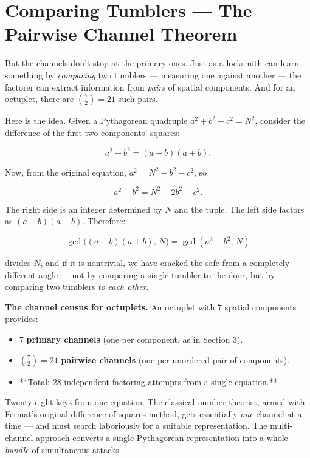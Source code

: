 \bigskip


\section{Comparing Tumblers --- The Pairwise Channel Theorem}

But the channels don't stop at the primary ones. Just as a locksmith can learn something by \textit{comparing} two tumblers --- measuring one against another --- the factorer can extract information from \textit{pairs} of spatial components. And for an octuplet, there are $\binom{7}{2} = 21$ such pairs.

Here is the idea. Given a Pythagorean quadruple $a^2 + b^2 + c^2 = N^2$, consider the difference of the first two components' squares:

\[
a^2 - b^2 = (a - b)(a + b).
\]

Now, from the original equation, $a^2 = N^2 - b^2 - c^2$, so

\[
a^2 - b^2 = N^2 - 2b^2 - c^2.
\]

The right side is an integer determined by $N$ and the tuple. The left side factors as $(a - b)(a + b)$. Therefore:

\[
\gcd\!\big((a - b)(a + b),\, N\big) = \gcd(a^2 - b^2, \, N)
\]

divides $N$, and if it is nontrivial, we have cracked the safe from a completely different angle --- not by comparing a single tumbler to the door, but by comparing two tumblers \textit{to each other}.

\textbf{The channel census for octuplets.} An octuplet with $7$ spatial components provides:

\begin{itemize}
\item $7$ \textbf{primary channels} (one per component, as in Section 3).
\item $\binom{7}{2} = 21$ \textbf{pairwise channels} (one per unordered pair of components).
\item **Total: $28$ independent factoring attempts from a single equation.**
\end{itemize}
Twenty-eight keys from one equation. The classical number theorist, armed with Fermat's original difference-of-squares method, gets essentially \textit{one} channel at a time --- and must search laboriously for a suitable representation. The multi-channel approach converts a single Pythagorean representation into a whole \textit{bundle} of simultaneous attacks.

